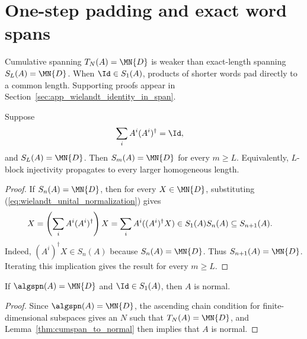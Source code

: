 \section{One-step padding and exact word spans}\label{sec:cumspan_to_wordspan}

Cumulative spanning $T_N(A)=\MN{D}$ is weaker than exact-length spanning
$S_L(A)=\MN{D}$. When $\Id\in S_1(A)$, products of shorter words pad directly to a
common length. Supporting proofs appear in
Section~\ref{sec:app_wielandt_identity_in_span}.

\begin{lemma}%
    \label{thm:wordspan_propagation_unital}
    \leanok
    Suppose
    \begin{align}
        \sum_i A^i(A^i)^\dagger
         & =\Id,
        \label{eq:wielandt_unital_normalization}
    \end{align}
    and $S_L(A)=\MN{D}$.
    Then $S_m(A)=\MN{D}$ for every $m\ge L$.
    Equivalently, $L$-block injectivity propagates to every larger
    homogeneous length.
\end{lemma}

\begin{proof}\leanok{}
    If $S_n(A)=\MN{D}$, then for every $X\in\MN{D}$,
    substituting (\ref{eq:wielandt_unital_normalization}) gives
    \begin{align}
        X
         & =\left(\sum_i A^i(A^i)^\dagger\right)X
        =\sum_i A^i((A^i)^\dagger X)
        \in S_1(A)S_n(A)
        \subseteq S_{n+1}(A).
        \notag
    \end{align}
    Indeed, $(A^i)^\dagger X\in S_n(A)$ because
    $S_n(A)=\MN{D}$.
    Thus $S_{n+1}(A)=\MN{D}$.
    Iterating this implication gives the result for every $m\ge L$.
\end{proof}

\begin{lemma}%
    \label{thm:algspan_to_normal}
    \leanok
    If $\algspn(A)=\MN{D}$ and $\Id\in S_1(A)$, then $A$ is normal.
\end{lemma}

\begin{proof}\leanok{}
    Since $\algspn(A)=\MN{D}$, the ascending chain condition for
    finite-dimensional subspaces gives an $N$ such that $T_N(A)=\MN{D}$, and
    Lemma~\ref{thm:cumspan_to_normal} then implies that $A$ is normal.
\end{proof}

